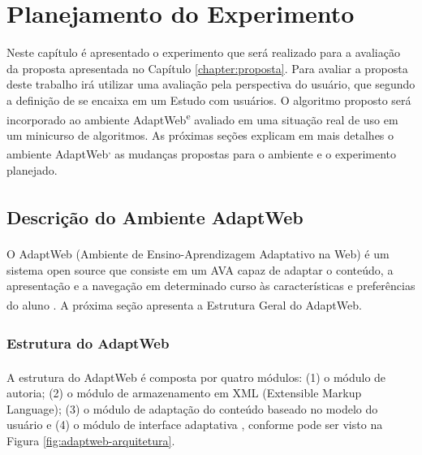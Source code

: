 \chapter{Planejamento do Experimento}\label{chapter:experimento}

Neste capítulo é apresentado o experimento que será realizado para a avaliação da proposta apresentada no Capítulo \ref{chapter:proposta}.
Para avaliar a proposta deste trabalho irá utilizar uma avaliação pela perspectiva do usuário, que segundo a definição de
 se encaixa em um Estudo com usuários. O algoritmo proposto será incorporado ao ambiente
AdaptWeb\textsuperscript e avaliado em uma situação real de uso em um minicurso de algoritmos. As próximas seções explicam
em mais detalhes o ambiente AdaptWeb\textsuperscript, as mudanças propostas para o ambiente e o experimento planejado.

\section{Descrição do Ambiente AdaptWeb\textsuperscript{\textregistered}}

O AdaptWeb\textsuperscript{\textregistered} (Ambiente de Ensino-Aprendizagem Adaptativo na Web) é um sistema open source
que consiste em um AVA capaz de adaptar o conteúdo, a apresentação e a navegação em determinado curso às características
e preferências do aluno \cite{gasparini2009adaptweb}. A próxima seção apresenta a Estrutura Geral do
AdaptWeb\textsuperscript{\textregistered}.

\subsection{Estrutura do AdaptWeb\textsuperscript{\textregistered}}

A estrutura do AdaptWeb\textsuperscript{\textregistered} é composta por quatro módulos: (1) o módulo de autoria; (2) o
módulo de armazenamento em XML (Extensible Markup Language); (3) o módulo de adaptação do conteúdo baseado no modelo do
usuário e (4) o módulo de interface adaptativa \cite{gasparini2003interface}, conforme pode ser visto na Figura
\ref{fig:adaptweb-arquitetura}.

